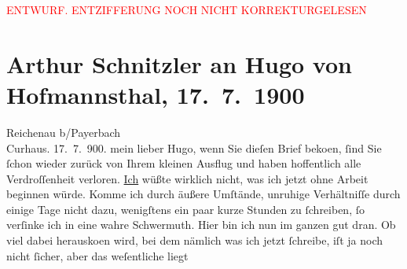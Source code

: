 
\begin{center}
            \textcolor{red}{ENTWURF. ENTZIFFERUNG NOCH NICHT KORREKTURGELESEN}
                      \end{center}
            
               \section[Arthur Schnitzler an Hugo von Hofmannsthal, 17. 7. 1900]{ Arthur Schnitzler an Hugo von Hofmannsthal, 17. 7. 1900}\nopagebreak{}\rehead{ }\begin{ledgroupsized}[t]{13cm}\normalsize\beginnumbering{} \toendnotes[C]{\smallbreak\pagebreak[2]} 
\toendnotes[C]{\smallbreak}\pstart
           \raggedleft{}{\pb}Reichenau b/Payerbach{\\}Curhaus.
                     17. 7. 900. \pend
           \pstart
           mein lieber Hugo, wenn Sie dieſen Brief beko{\geminationm}en, ſind Sie ſchon wieder zurück von Ihrem kleinen
               Ausflug und haben hoffentlich \introOben{}alle\introOben{} Verdroſſenheit verloren.
                  \uline{Ich} wüßte wirklich nicht, was ich jetzt ohne
               Arbeit beginnen würde. Komme ich durch äußere Umſtände, unruhige Verhältniſſe durch
               einige Tage nicht dazu, wenigſtens ein paar kurze Stunden zu ſchreiben, ſo verſinke
               ich in eine wahre Schwermuth. Hier bin ich nun im ganzen {\pb}gut dran. Ob viel dabei herausko{\geminationm}en wird, bei dem
               nämlich was ich jetzt ſchreibe, iſt ja noch nicht ſicher, aber das weſentliche liegt

\end{ledgroupsized}
